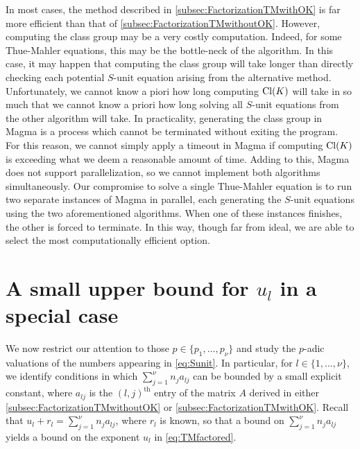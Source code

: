 In most cases, the method described in \autoref{subsec:FactorizationTMwithOK} is far more efficient than that of \autoref{subsec:FactorizationTMwithoutOK}. However, computing the class group may be a very costly computation. Indeed, for some Thue-Mahler equations, this may be the bottle-neck of the algorithm. In this case, it may happen that computing the class group will take longer than directly checking each potential $S$-unit equation arising from the alternative method. Unfortunately, we cannot know a piori how long computing $\operatorname{Cl}(K)$ will take in so much that we cannot know a priori how long solving all $S$-unit equations from the other algorithm will take. In practicality, generating the class group in Magma is a process which cannot be terminated without exiting the program. For this reason, we cannot simply apply a timeout in Magma if computing $\operatorname{Cl}(K)$ is exceeding what we deem a reasonable amount of time. Adding to this, Magma does not support parallelization, so we cannot implement both algorithms simultaneously. Our compromise to solve a single Thue-Mahler equation is to run two separate instances of Magma in parallel, each generating the $S$-unit equations using the two aforementioned algorithms. When one of these instances finishes, the other is forced to terminate. In this way, though far from ideal, we are able to select the most computationally efficient option. 


\section{A small upper bound for $u_l$ in a special case}
\label{sec:SmallBoundForSpecialCase}

We now restrict our attention to those $p \in \{p_1, \dots, p_{\nu}\}$ and study the $p$-adic valuations of the numbers appearing in \eqref{eq:Sunit}. In particular, for $l \in \{1, \dots, \nu\}$, we identify conditions in which $\sum_{j = 1}^{\nu} n_ja_{lj}$ can be bounded by a small explicit constant, where $a_{lj}$ is the $(l,j)^{\text{th}}$ entry of the matrix $A$ derived in either \autoref{subsec:FactorizationTMwithoutOK} or \autoref{subsec:FactorizationTMwithOK}. Recall that $u_l + r_l = \sum_{j = 1}^{\nu} n_ja_{lj}$, where $r_l$ is known, so that a bound on $\sum_{j = 1}^{\nu} n_ja_{lj}$ yields a bound on the exponent $u_l$ in \eqref{eq:TMfactored}.

